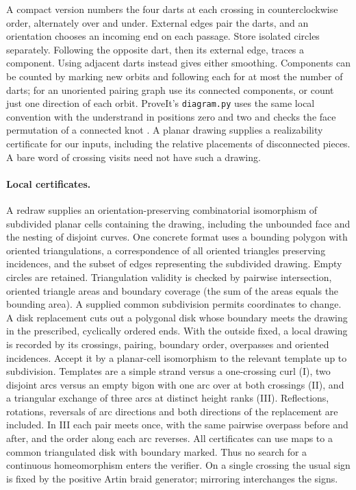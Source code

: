 A compact version numbers the four darts at each crossing in counterclockwise order, alternately over and under. External edges pair the darts, and an orientation chooses an incoming end on each passage. Store isolated circles separately. Following the opposite dart, then its external edge, traces a component. Using adjacent darts instead gives either smoothing. Components can be counted by marking new orbits and following each for at most the number of darts; for an unoriented pairing graph use its connected components, or count just one direction of each orbit. ProveIt's \texttt{diagram.py} uses the same local convention with the understrand in positions zero and two and checks the face permutation of a connected knot \cite{validator}. A planar drawing supplies a realizability certificate for our inputs, including the relative placements of disconnected pieces. A bare word of crossing visits need not have such a drawing.

\paragraph{Local certificates.}
A redraw supplies an orientation-preserving combinatorial isomorphism of subdivided planar cells containing the drawing, including the unbounded face and the nesting of disjoint curves. One concrete format uses a bounding polygon with oriented triangulations, a correspondence of all oriented triangles preserving incidences, and the subset of edges representing the subdivided drawing. Empty circles are retained. Triangulation validity is checked by pairwise intersection, oriented triangle areas and boundary coverage (the sum of the areas equals the bounding area). A supplied common subdivision permits coordinates to change. A disk replacement cuts out a polygonal disk whose boundary meets the drawing in the prescribed, cyclically ordered ends. With the outside fixed, a local drawing is recorded by its crossings, pairing, boundary order, overpasses and oriented incidences. Accept it by a planar-cell isomorphism to the relevant template up to subdivision. Templates are a simple strand versus a one-crossing curl (I), two disjoint arcs versus an empty bigon with one arc over at both crossings (II), and a triangular exchange of three arcs at distinct height ranks (III). Reflections, rotations, reversals of arc directions and both directions of the replacement are included. In III each pair meets once, with the same pairwise overpass before and after, and the order along each arc reverses. All certificates can use maps to a common triangulated disk with boundary marked. Thus no search for a continuous homeomorphism enters the verifier. On a single crossing the usual sign is fixed by the positive Artin braid generator; mirroring interchanges the signs.

